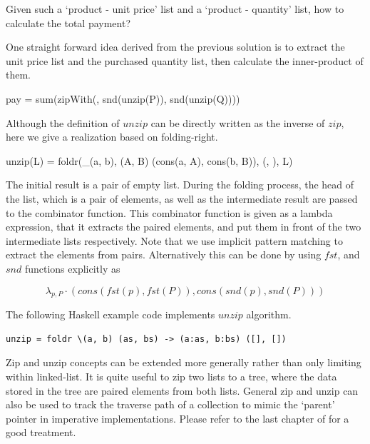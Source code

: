 \documentclass[b5paper]{article}
\begin{document}
Given such a `product - unit price' list and a `product - quantity' list, how to calculate the total payment?

One straight forward idea derived from the previous solution is to extract the unit price list and the purchased
quantity list, then calculate the inner-product of them.

\be
pay = sum(zipWith(\times, snd(unzip(P)), snd(unzip(Q))))
\ee

Although the definition of $unzip$ can be directly written as the inverse of $zip$, here we give a realization based on
folding-right.

\be
unzip(L) = foldr(\lambda_{(a, b), (A, B)} \cdot (cons(a, A), cons(b, B)), (\phi, \phi), L)
\ee

The initial result is a pair of empty list. During the folding process, the head of the list, which is a pair
of elements, as well as the intermediate result are passed to the combinator function. This combinator function
is given as a lambda expression, that it extracts the paired elements, and put them in front of the two
intermediate lists respectively. Note that we use implicit pattern matching to extract the elements from
pairs. Alternatively this can be done by using $fst$, and $snd$ functions explicitly as

\[
\lambda_{p, P} \cdot (cons(fst(p), fst(P)), cons(snd(p), snd(P)))
\]

The following Haskell example code implements $unzip$ algorithm.

\lstset{language=Haskell}
\begin{lstlisting}
unzip = foldr \(a, b) (as, bs) -> (a:as, b:bs) ([], [])
\end{lstlisting}

Zip and unzip concepts can be extended more generally rather than only limiting within linked-list. It is quite
useful to zip two lists to a tree, where the data stored in the tree are paired elements from both lists.
General zip and unzip can also be used to track the traverse path of a collection to mimic the `parent' pointer
in imperative implementations. Please refer to the last chapter of \cite{learn-haskell} for a good treatment.
\end{document}
